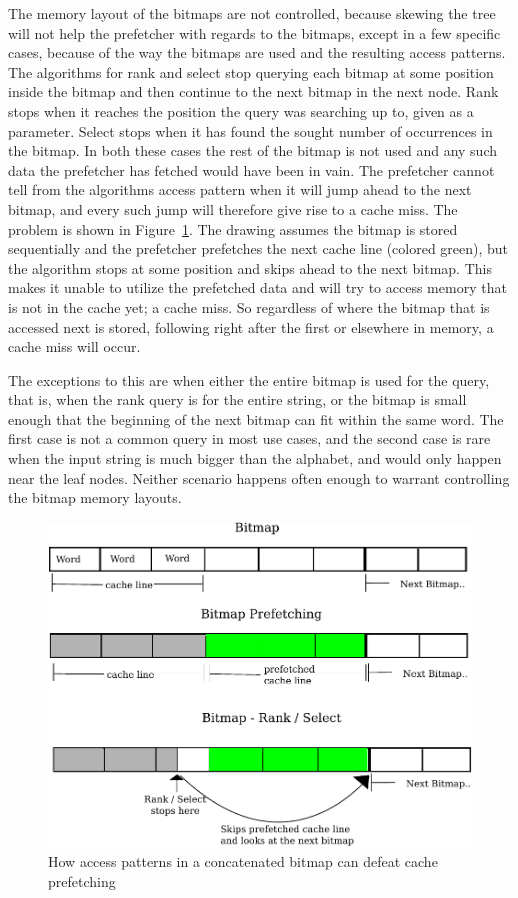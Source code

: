 The memory layout of the bitmaps are not controlled, because skewing the tree will not help the prefetcher with regards to the bitmaps, except in a few specific cases, because of the way the bitmaps are used and the resulting access patterns.
The algorithms for rank and select stop querying each bitmap at some position inside the bitmap and then continue to the next bitmap in the next node.
Rank stops when it reaches the position the query was searching up to, given as a parameter.
Select stops when it has found the sought number of occurrences in the bitmap.
In both these cases the rest of the bitmap is not used and any such data the prefetcher has fetched would have been in vain.
The prefetcher cannot tell from the algorithms access pattern when it will jump ahead to the next bitmap, and every such jump will therefore give rise to a cache miss.
The problem is shown in Figure~\ref{fig:QueryPrefetchFigure}. The drawing assumes the bitmap is stored sequentially and the prefetcher prefetches the next cache line (colored green), but the algorithm stops at some position and skips ahead to the next bitmap. 
This makes it unable to utilize the prefetched data and will try to access memory that is not in the cache yet; a cache miss.
So regardless of where the bitmap that is accessed next is stored, following right after the first or elsewhere in memory, a cache miss will occur.

The exceptions to this are when either the entire bitmap is used for the query, that is, when the rank query is for the entire string, or the bitmap is small enough that the beginning of the next bitmap can fit within the same word.
The first case is not a common query in most use cases, and the second case is rare when the input string is much bigger than the alphabet, and would only happen near the leaf nodes.
Neither scenario happens often enough to warrant controlling the bitmap memory layouts.

\begin{figure}\tiny
\includegraphics[width=\textwidth]{QueryPrefetchFigure.pdf}
\caption{How access patterns in a concatenated bitmap can defeat cache prefetching}
\label{fig:QueryPrefetchFigure}
\end{figure}



